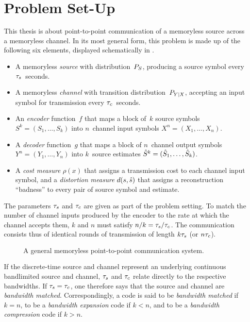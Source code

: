 \section{Problem Set-Up}\label{sec:setup}

This thesis is about point-to-point communication of a memoryless source across
a memoryless channel. In its most general form, this problem is made up of the
following six elements, displayed schematically in .
\begin{itemize}
  \item A memoryless \emph{source} with distribution~${P_S}$, producing a source
    symbol every ${\tau_s}$~seconds.
  \item A memoryless \emph{channel} with transition distribution~$P_{Y|X}$,
    accepting an input symbol for transmission every ${\tau_c}$~seconds.
  \item An \emph{encoder} function~$f$ that maps a block of~$k$ source symbols
    $S^k = (S_1, \dots, S_k)$ into $n$~channel input symbols $X^n = (X_1, \dots,
    X_n)$.
  \item A \emph{decoder} function~$g$ that maps a block of $n$~channel output
    symbols $Y^n = (Y_1, \dots, Y_n)$ into $k$~source estimates ${\hat{S}}^k = ({\hat{S}}_1,
    \dots, {\hat{S}}_k)$.
  \item A \emph{cost measure} $\rho(x)$ that assigns a transmission cost to each
    channel input symbol, and a \emph{distortion measure} $d(s,{\hat{s}})$ that
    assigns a reconstruction ``badness'' to every pair of source symbol and
    estimate.
\end{itemize}
The parameters ${\tau_s}$ and ${\tau_c}$ are given as part of the problem
setting. To match the number of channel inputs produced by the encoder to the
rate at which the channel accepts them, $k$ and $n$ must satisfy $n/k = {\tau_s} /
{\tau_c}$. The communication consists thus of identical rounds of transmission of
length $k{\tau_s}$ (or $n{\tau_c}$).


\begin{figure}
  \begin{center}
    
  \end{center}
  \caption{A general memoryless point-to-point communication system.}
  \label{fig:scgen}
\end{figure}

If the discrete-time source and channel represent an underlying continuous
bandlimited source and channel, ${\tau_s}$ and ${\tau_c}$ relate directly to
the respective bandwidths. If ${\tau_s} = {\tau_c}$, one therefore says that the source
and channel are \emph{bandwidth matched}. Correspondingly, a code is said to be
\emph{bandwidth matched} if $k=n$, to be a \emph{bandwidth expansion} code if $k
< n$, and to be a \emph{bandwidth compression} code if $k > n$. 

